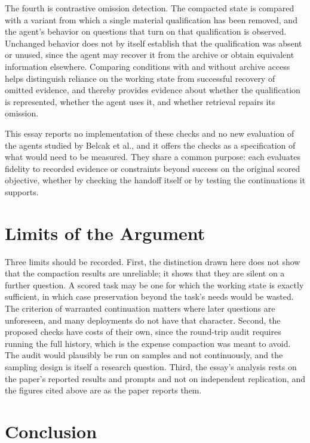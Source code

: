 \documentclass[11pt]{article}
\begin{document}
The fourth is contrastive omission detection. The compacted state is compared with a variant from which a single material qualification has been removed, and the agent's behavior on questions that turn on that qualification is observed. Unchanged behavior does not by itself establish that the qualification was absent or unused, since the agent may recover it from the archive or obtain equivalent information elsewhere. Comparing conditions with and without archive access helps distinguish reliance on the working state from successful recovery of omitted evidence, and thereby provides evidence about whether the qualification is represented, whether the agent uses it, and whether retrieval repairs its omission.

This essay reports no implementation of these checks and no new evaluation of the agents studied by Belcak et al., and it offers the checks as a specification of what would need to be measured. They share a common purpose: each evaluates fidelity to recorded evidence or constraints beyond success on the original scored objective, whether by checking the handoff itself or by testing the continuations it supports.

\section{Limits of the Argument}

Three limits should be recorded. First, the distinction drawn here does not show that the compaction results are unreliable; it shows that they are silent on a further question. A scored task may be one for which the working state is exactly sufficient, in which case preservation beyond the task's needs would be wasted. The criterion of warranted continuation matters where later questions are unforeseen, and many deployments do not have that character. Second, the proposed checks have costs of their own, since the round-trip audit requires running the full history, which is the expense compaction was meant to avoid. The audit would plausibly be run on samples and not continuously, and the sampling design is itself a research question. Third, the essay's analysis rests on the paper's reported results and prompts and not on independent replication, and the figures cited above are as the paper reports them.

\section{Conclusion}
\end{document}

